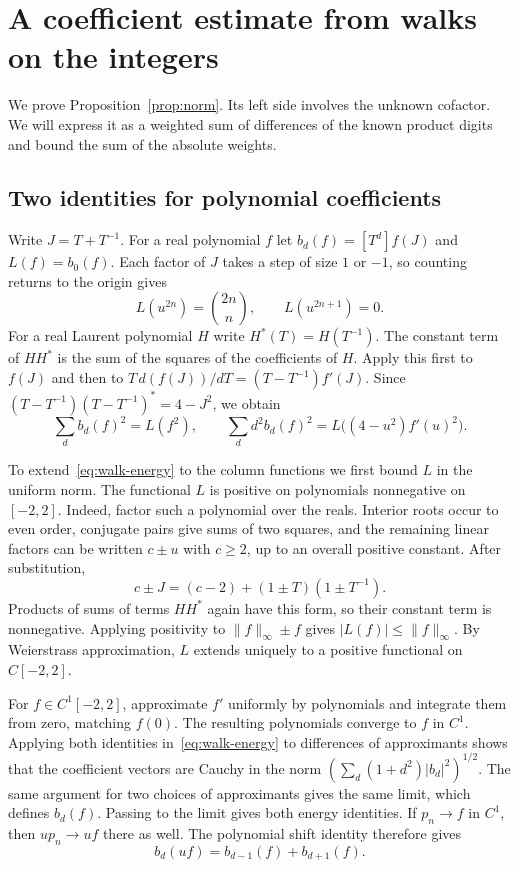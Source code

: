 \documentclass[11pt,reqno]{amsart}
\numberwithin{equation}{section}
\begin{document}
\appendix
\section{A coefficient estimate from walks on the integers}\label{app:estimate}
We prove Proposition~\ref{prop:norm}. Its left side involves the unknown cofactor. We will express it as a weighted sum of differences of the known product digits and bound the sum of the absolute weights.

\subsection{Two identities for polynomial coefficients}
Write $J=T+T^{-1}$. For a real polynomial $f$ let $b_d(f)=[T^d]f(J)$ and $L(f)=b_0(f)$. Each factor of $J$ takes a step of size $1$ or $-1$, so counting returns to the origin gives
\begin{equation}\label{eq:walk-moments}
 L(u^{2n})=\binom{2n}{n},\qquad L(u^{2n+1})=0 .
\end{equation}
For a real Laurent polynomial $H$ write $H^*(T)=H(T^{-1})$. The constant term of $HH^*$ is the sum of the squares of the coefficients of $H$. Apply this first to $f(J)$ and then to $T\,d(f(J))/dT=(T-T^{-1})f'(J)$. Since $(T-T^{-1})(T-T^{-1})^*=4-J^2$, we obtain
\begin{equation}\label{eq:walk-energy}
 \sum_d b_d(f)^2=L(f^2),\qquad
 \sum_d d^2 b_d(f)^2=L\big((4-u^2)f'(u)^2\big).
\end{equation}

To extend~\eqref{eq:walk-energy} to the column functions we first bound $L$ in the uniform norm. The functional $L$ is positive on polynomials nonnegative on $[-2,2]$. Indeed, factor such a polynomial over the reals. Interior roots occur to even order, conjugate pairs give sums of two squares, and the remaining linear factors can be written $c\pm u$ with $c\ge2$, up to an overall positive constant. After substitution,
\[
 c\pm J=(c-2)+(1\pm T)(1\pm T^{-1}).
\]
Products of sums of terms $HH^*$ again have this form, so their constant term is nonnegative. Applying positivity to $\|f\|_\infty\pm f$ gives $|L(f)|\le\|f\|_\infty$. By Weierstrass approximation, $L$ extends uniquely to a positive functional on $C[-2,2]$.

For $f\in C^1[-2,2]$, approximate $f'$ uniformly by polynomials and integrate them from zero, matching $f(0)$. The resulting polynomials converge to $f$ in $C^1$. Applying both identities in~\eqref{eq:walk-energy} to differences of approximants shows that the coefficient vectors are Cauchy in the norm $(\sum_d(1+d^2)|b_d|^2)^{1/2}$. The same argument for two choices of approximants gives the same limit, which defines $b_d(f)$. Passing to the limit gives both energy identities. If $p_n\to f$ in $C^1$, then $up_n\to uf$ there as well. The polynomial shift identity therefore gives
\begin{equation}\label{eq:walk-shift}
 b_d(uf)=b_{d-1}(f)+b_{d+1}(f).
\end{equation}
\end{document}
